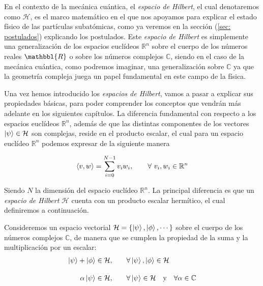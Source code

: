\documentclass[12pt]{article}
\numberwithin{equation}{section} %
\begin{document}
    En el contexto de la mecánica cuántica, el \textit{espacio de Hilbert}, el cual denotaremos como \( \mathcal{H} \), es el marco matemático en el que nos apoyamos para explicar el estado físico de las partículas subatómicas, como ya veremos en la sección (\ref{sec: postulados}) explicando los postulados. Este \textit{espacio de Hilbert} es simplemente una generalización de los espacios euclídeos \( \mathbb{R}^{n} \) sobre el cuerpo de los números reales \( \mathbbl{R} \) o sobre los números complejos \( \mathbb{C} \), siendo en el caso de la mecánica cuántica, como podremos imaginar, una generalización sobre \( \mathbb{C} \) ya que la geometría compleja juega un papel fundamental en este campo de la física.
    
    \vspace{5mm}

    Una vez hemos introducido los \textit{espacios de Hilbert}, vamos a pasar a explicar sus propiedades básicas, para poder comprender los conceptos que vendrán más adelante en los siguientes capítulos. La diferencia fundamental con respecto a los espacios euclídeos \( \mathbb{R}^{n} \), además de que las distintas componentes de los vectores \( \ket{\psi} \in \mathcal{H} \) son complejas, reside en el producto escalar, el cual para un espacio euclídeo \( \mathbb{R}^{n} \) podemos expresar de la siguiente manera

    \begin{equation*}
        \braket{v, w} = \sum_{i = 0}^{N - 1} v_{i} w_{i}, \qquad \forall \ v_{i}, w_{i} \in \mathbb{R}^{n}
    \end{equation*}

    \vspace{2.5mm}

    Siendo \( N \) la dimensión del espacio euclídeo \( \mathbb{R}^{n} \). La principal diferencia es que un \textit{espacio de Hilbert} \( \mathcal{H} \) cuenta con un producto escalar hermítico, el cual definiremos a continuación.

    \vspace{5mm}

    Consideremos un espacio vectorial \( \mathcal{H} = \{ \ket{\psi}, \ket{\phi}, \cdots \} \) sobre el cuerpo de los números complejos \( \mathbb{C} \), de manera que se cumplen la propiedad de la suma y la multiplicación por un escalar:
    \begin{align*}
        \ket{\psi} + \ket{\phi} \in \mathcal{H}, \qquad &\forall \ket{\psi}, \ket{\phi} \in \mathcal{H}\\[10pt]
        \alpha \ket{\psi} \in \mathcal{H}, \qquad &\forall \ket{\psi} \in \mathcal{H} \quad \text{y} \quad \forall \alpha \in \mathbb{C}
    \end{align*}
\end{document}
